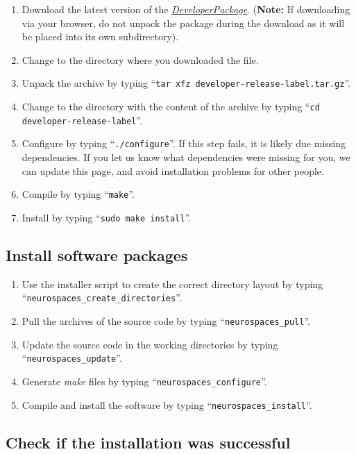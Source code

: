 \documentclass[12pt]{article}
\begin{document}
\begin{enumerate}
   \item Download the latest version of the \href{https://github.com/HugoCornelis/developer/blob/master/developer-0.0.0-alpha.tar.gz?raw=true}{{\it DeveloperPackage}}.  ({\bf Note:} If downloading via your browser, do not unpack the package during the download as it will be placed into its own subdirectory).
   \item Change to the directory where you downloaded the file.
   \item Unpack the archive by typing ``{\tt tar xfz developer-release-label.tar.gz}''.
   \item Change to the directory with the content of the archive by typing ``{\tt cd developer-release-label}''.
   \item Configure by typing ``{\tt ./configure}''.  If this step fails, it is likely due missing dependencies.  If you let us know what dependencies were missing for you, we can update this page, and avoid installation problems for other people.
   \item Compile by typing ``{\tt make}''.
   \item Install by typing ``{\tt sudo make install}''. 
\end{enumerate}

\subsection*{Install software packages}

\begin{enumerate}
   \item Use the installer script to create the correct directory layout by typing ``{\tt neurospaces\_create\_directories}''.
   \item Pull the archives of the source code by typing ``{\tt neurospaces\_pull}''.
   \item Update the source code in the working directories by typing ``{\tt neurospaces\_update}''.
   \item Generate {\it make} files by typing ``{\tt neurospaces\_configure}''.
   \item Compile and install the software by typing ``{\tt neurospaces\_install}''.
\end{enumerate}

\subsection*{Check if the installation was successful}
\end{document}

